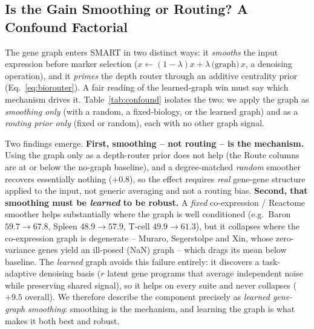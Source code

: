 \documentclass[letterpaper]{article}
\begin{document}
\begin{table}[t]
\caption{\textbf{Main results, read left to right from baseline to best.} Each cell is
\emph{macro-F1 / accuracy} (\%), mean over seeds (3 for architecture,
10 for routing). We first trace the \emph{architecture} ladder at fixed
routing -- \emph{Vanilla} ($K$ independent layers) $\to$ \emph{Recursive} (weight-shared,
fixed depth) $\to$ \emph{MoR} (adaptive expert-choice recursion): accuracy is flat
(efficiency, not accuracy). We then vary the \emph{routing prior} on MoR -- \emph{None}
$\to$ \emph{Random} $\to$ \emph{Biology} (fixed hand-built graph) $\to$ \emph{Learned}
(graph trained end-to-end) $\to$ \emph{Learn$_{bio}$} (learned graph warm-started from
biology): the learned graphs are the decisive win, the fixed prior hurts. The bottom
\emph{$\Delta$ macro-F1} row is the gain over the Vanilla baseline, mean over all
11 datasets.}
\label{tab:learned}
\end{table}

\subsection{Is the Gain Smoothing or Routing? A Confound Factorial}
\label{sec:confound}
The gene graph enters SMART in two distinct ways: it \emph{smooths} the input expression
before marker selection ($x\leftarrow(1-\lambda)x+\lambda\,\text{(graph)}\,x$, a
denoising operation), and it \emph{primes} the depth router through an additive centrality
prior (Eq.~\ref{eq:biorouter}). A fair reading of the learned-graph win must say which
mechanism drives it. Table~\ref{tab:confound} isolates the two: we apply the graph as
\emph{smoothing only} (with a random, a fixed-biology, or the learned graph) and as a
\emph{routing prior only} (fixed or random), each with no other graph signal.

Two findings emerge. \textbf{First, smoothing -- not routing -- is the mechanism.} Using
the graph only as a depth-router prior does not help (the Route columns are at or below
the no-graph baseline), and a degree-matched \emph{random} smoother recovers essentially
nothing ($+0.8$), so the effect requires \emph{real} gene-gene structure applied to the
input, not generic averaging and not a routing bias. \textbf{Second, that smoothing must
be \emph{learned} to be robust.} A \emph{fixed} co-expression / Reactome smoother helps
substantially where the graph is well conditioned (e.g.\ Baron $59.7\!\to\!67.8$, Spleen
$48.9\!\to\!57.9$, T-cell $49.9\!\to\!61.3$), but it collapses where the co-expression
graph is degenerate -- Muraro, Segerstolpe and Xin, whose zero-variance genes yield an
ill-posed (NaN) graph -- which drags its mean below baseline. The \emph{learned} graph
avoids this failure entirely: it discovers a task-adaptive denoising basis ($r$ latent
gene programs that average independent noise while preserving shared signal), so it helps
on every suite and never collapses ($+9.5$ overall). We therefore describe the component
precisely as \emph{learned gene-graph smoothing}: smoothing is the mechanism, and learning
the graph is what makes it both best and robust.
\end{document}

